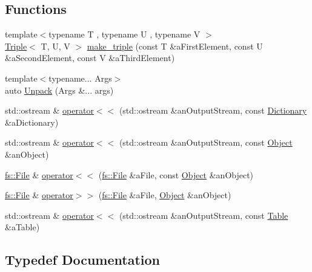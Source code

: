 \subsection*{Functions}
\begin{DoxyCompactItemize}
\item 
{\footnotesize template$<$typename T , typename U , typename V $>$ }\\\hyperlink{structlibrary_1_1core_1_1ctnr_1_1_triple}{Triple}$<$ T, U, V $>$ \hyperlink{namespacelibrary_1_1core_1_1ctnr_a96a0b941c0de59772cb5e073d0c2b8a8}{make\+\_\+triple} (const T \&a\+First\+Element, const U \&a\+Second\+Element, const V \&a\+Third\+Element)
\item 
{\footnotesize template$<$typename... Args$>$ }\\auto \hyperlink{namespacelibrary_1_1core_1_1ctnr_aa83e692c1420d325c7602ae7b21d626d}{Unpack} (Args \&... args)
\item 
std\+::ostream \& \hyperlink{namespacelibrary_1_1core_1_1ctnr_a5089e336819bf6e43bdb9ea9c8c01fcf}{operator$<$$<$} (std\+::ostream \&an\+Output\+Stream, const \hyperlink{classlibrary_1_1core_1_1ctnr_1_1_dictionary}{Dictionary} \&a\+Dictionary)
\item 
std\+::ostream \& \hyperlink{namespacelibrary_1_1core_1_1ctnr_a20ee48a4a564834bae30af868b549043}{operator$<$$<$} (std\+::ostream \&an\+Output\+Stream, const \hyperlink{classlibrary_1_1core_1_1ctnr_1_1_object}{Object} \&an\+Object)
\item 
\hyperlink{classlibrary_1_1core_1_1fs_1_1_file}{fs\+::\+File} \& \hyperlink{namespacelibrary_1_1core_1_1ctnr_af1692b068183ff60da620deb994a8b59}{operator$<$$<$} (\hyperlink{classlibrary_1_1core_1_1fs_1_1_file}{fs\+::\+File} \&a\+File, const \hyperlink{classlibrary_1_1core_1_1ctnr_1_1_object}{Object} \&an\+Object)
\item 
\hyperlink{classlibrary_1_1core_1_1fs_1_1_file}{fs\+::\+File} \& \hyperlink{namespacelibrary_1_1core_1_1ctnr_a0a7da2e178e3ef26afa29284deb8de0f}{operator$>$$>$} (\hyperlink{classlibrary_1_1core_1_1fs_1_1_file}{fs\+::\+File} \&a\+File, \hyperlink{classlibrary_1_1core_1_1ctnr_1_1_object}{Object} \&an\+Object)
\item 
std\+::ostream \& \hyperlink{namespacelibrary_1_1core_1_1ctnr_aae8e4f8665fde7fdd3e3f479e48c90aa}{operator$<$$<$} (std\+::ostream \&an\+Output\+Stream, const \hyperlink{classlibrary_1_1core_1_1ctnr_1_1_table}{Table} \&a\+Table)
\end{DoxyCompactItemize}


\subsection{Typedef Documentation}
\mbox{\label{namespacelibrary_1_1core_1_1ctnr_a87ccf40619002299b341a5e76e989912}} 
